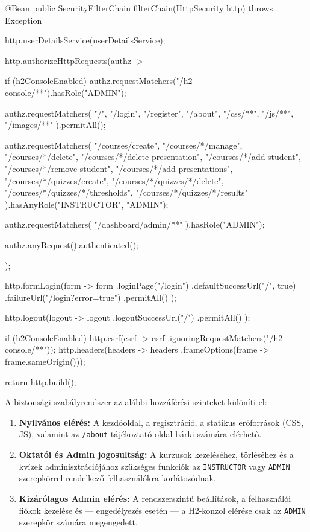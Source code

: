 \begin{java}[caption={A SecurityFilterChain konfigurálása},label=java:securityconfig]
@Bean
public SecurityFilterChain filterChain(HttpSecurity http)
        throws Exception {

    http.userDetailsService(userDetailsService);

    http.authorizeHttpRequests(authz -> {
        if (h2ConsoleEnabled) {
            authz.requestMatchers("/h2-console/**").hasRole("ADMIN");
        }

        authz.requestMatchers(
                "/", "/login", "/register", "/about",
                "/css/**", "/js/**", "/images/**"
        ).permitAll();

        authz.requestMatchers(
                "/courses/create",
                "/courses/*/manage",
                "/courses/*/delete",
                "/courses/*/delete-presentation",
                "/courses/*/add-student",
                "/courses/*/remove-student",
                "/courses/*/add-presentations",
                "/courses/*/quizzes/create",
                "/courses/*/quizzes/*/delete",
                "/courses/*/quizzes/*/thresholds",
                "/courses/*/quizzes/*/results"
        ).hasAnyRole("INSTRUCTOR", "ADMIN");

        authz.requestMatchers(
                "/dashboard/admin/**"
        ).hasRole("ADMIN");

        authz.anyRequest().authenticated();
    });

    http.formLogin(form -> form
            .loginPage("/login")
            .defaultSuccessUrl("/", true)
            .failureUrl("/login?error=true")
            .permitAll()
    );

    http.logout(logout -> logout
            .logoutSuccessUrl("/")
            .permitAll()
    );

    if (h2ConsoleEnabled) {
        http.csrf(csrf -> csrf
                .ignoringRequestMatchers("/h2-console/**"));
        http.headers(headers -> headers
                .frameOptions(frame -> frame.sameOrigin()));
    }

    return http.build();
}
\end{java}

A biztonsági szabályrendszer az alábbi hozzáférési szinteket különíti el:
\begin{enumerate}
\item \textbf{Nyilvános elérés:} A kezdőoldal, a regisztráció, a statikus erőforrások (CSS, JS), valamint az \texttt{/about} tájékoztató oldal bárki számára elérhető.
\item \textbf{Oktatói és Admin jogosultság:} A kurzusok kezeléséhez, törléséhez és a kvízek adminisztrációjához szükséges funkciók az \texttt{INSTRUCTOR} vagy \texttt{ADMIN} szerepkörrel rendelkező felhasználókra korlátozódnak.
\item \textbf{Kizárólagos Admin elérés:} A rendszerszintű beállítások, a felhasználói fiókok kezelése és — engedélyezés esetén — a H2-konzol elérése csak az \texttt{ADMIN} szerepkör számára megengedett.
\end{enumerate}

